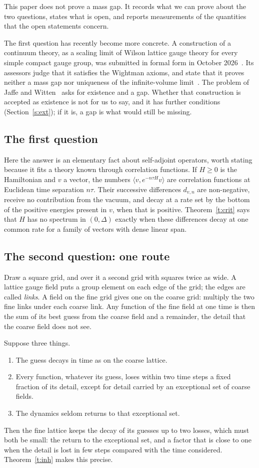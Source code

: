 This paper does not prove a mass gap. It records what we can prove about the two questions, states what is
open, and reports measurements of the quantities that the open statements concern.

The first question has recently become more concrete. A construction of a continuum theory, as a scaling
limit of Wilson lattice gauge theory for every simple compact gauge group, was submitted in formal form in
October 2026~\cite{OAI}. Its assessors judge that it satisfies the Wightman axioms, and state that it proves
neither a mass gap nor uniqueness of the infinite-volume limit~\cite[p.~1]{YMG}. The problem of Jaffe and
Witten~\cite[\S4]{JW} asks for existence and a gap. Whether that construction is accepted as existence is not
for us to say, and it has further conditions (Section~\ref{s:ext}); if it is, a gap is what would still be
missing.

\subsection{The first question}
Here the answer is an elementary fact about self-adjoint operators, worth stating because it fits a theory
known through correlation functions. If $H\ge0$ is the Hamiltonian and $v$ a vector, the numbers
$\langle v,e^{-n\tau H}v\rangle$ are correlation functions at Euclidean time separation $n\tau$. Their
successive differences $d_{v,n}$ are non-negative, receive no contribution from the vacuum, and decay at a
rate set by the bottom of the positive energies present in $v$, when that is positive. Theorem~\ref{t:crit} says that $H$ has no spectrum in
$(0,\Delta)$ exactly when these differences decay at one common rate for a family of vectors with dense
linear span.

\subsection{The second question: one route}
Draw a square grid, and over it a second grid with squares twice as wide. A lattice gauge field puts a group
element on each edge of the grid; the edges are called \emph{links}. A field on the fine grid gives one on
the coarse grid: multiply the two fine links under each coarse link. Any function of the fine field at one
time is then the sum of its best guess from the coarse field and a remainder, the detail that the coarse
field does not see.

Suppose three things.
\begin{enumerate}
\item[(a)] The guess decays in time as on the coarse lattice.
\item[(b)] Every function, whatever its guess, loses within two time steps a fixed fraction of its detail,
except for detail carried by an exceptional set of coarse fields.
\item[(c)] The dynamics seldom returns to that exceptional set.
\end{enumerate}
Then the fine lattice keeps the decay of its guesses up to two losses, which must both be small: the return to
the exceptional set, and a factor that is close to one when the detail is lost in few steps compared with
the time considered. Theorem~\ref{t:inh} makes this precise.

